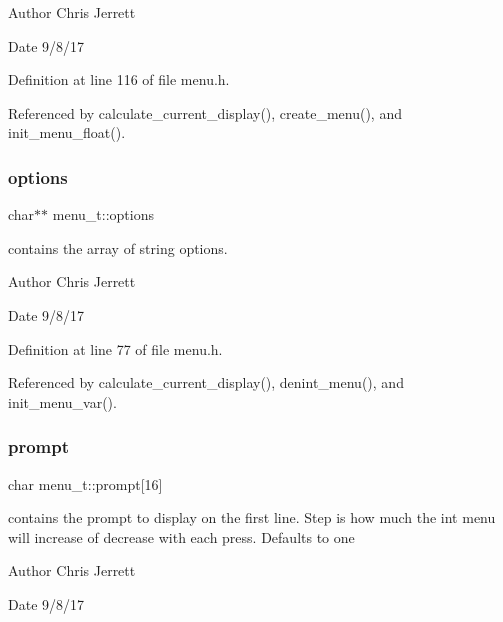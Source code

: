 \begin{DoxyAuthor}{Author}
Chris Jerrett 
\end{DoxyAuthor}
\begin{DoxyDate}{Date}
9/8/17 
\end{DoxyDate}


Definition at line 116 of file menu.\+h.



Referenced by calculate\+\_\+current\+\_\+display(), create\+\_\+menu(), and init\+\_\+menu\+\_\+float().

\mbox{\label{structmenu__t_ad695cd88051e34817f0f582d4e43c33a}} 
\subsubsection{\texorpdfstring{options}{options}}
{\footnotesize\ttfamily char$\ast$$\ast$ menu\+\_\+t\+::options}



contains the array of string options. 

\begin{DoxyAuthor}{Author}
Chris Jerrett 
\end{DoxyAuthor}
\begin{DoxyDate}{Date}
9/8/17 
\end{DoxyDate}


Definition at line 77 of file menu.\+h.



Referenced by calculate\+\_\+current\+\_\+display(), denint\+\_\+menu(), and init\+\_\+menu\+\_\+var().

\mbox{\label{structmenu__t_a5e3af2830962c2bbcb0a983f2c040c65}} 
\subsubsection{\texorpdfstring{prompt}{prompt}}
{\footnotesize\ttfamily char menu\+\_\+t\+::prompt\mbox{[}16\mbox{]}}



contains the prompt to display on the first line. Step is how much the int menu will increase of decrease with each press. Defaults to one 

\begin{DoxyAuthor}{Author}
Chris Jerrett 
\end{DoxyAuthor}
\begin{DoxyDate}{Date}
9/8/17 
\end{DoxyDate}


